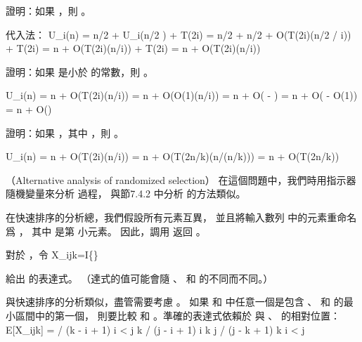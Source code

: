 \startitem
證明：如果 ，則 。
\stopitem

\startANSWER
代入法：
\startformula\startmathalignment
\NC U_i(n)
    \NC = \lfloor n/2 \rfloor + U_i(\lceil n/2 \rceil) + T(2i) \NR
\NC \NC = \lfloor n/2 \rfloor + \lceil n/2 \rceil +
             O(T(2i)\lg(\lfloor n/2 \rfloor / i)) + T(2i) \NR
\NC \NC = n + O(T(2i)\lg(n/i)) + T(2i) \NR
\NC \NC = n + O(T(2i)\lg(n/i)) \NR
\stopmathalignment\stopformula
\stopANSWER

\startitem
證明：如果  是小於  的常數，則 。
\stopitem

\startANSWER
\startformula\startmathalignment
\NC U_i(n)
    \NC = n + O(T(2i)\lg(n/i)) \NR
\NC \NC = n + O(O(1)\lg(n/i)) \NR
\NC \NC = n + O( - ) \NR
\NC \NC = n + O( - O(1)) \NR
\NC \NC = n + O() \NR
\stopmathalignment\stopformula
\stopANSWER

\startitem
證明：如果 ，其中 ，則 。
\stopitem

\startANSWER
\startformula\startmathalignment
\NC U_i(n)
    \NC = n + O(T(2i)\lg(n/i)) \NR
\NC \NC = n + O(T(2n/k)\lg(n/(n/k))) \NR
\NC \NC = n + O(T(2n/k)) \NR
\stopmathalignment\stopformula
\stopANSWER
\stopigBase
\stopPROBLEM

\startPROBLEM
（Alternative analysis of randomized selection）
在這個問題中，我們時用指示器隨機變量來分析  過程，
與節7.4.2 中分析  的方法類似。

在快速排序的分析總，我們假設所有元素互異，
並且將輸入數列  中的元素重命名爲 ，
其中  是第  小元素。
因此，調用  返回 。

對於 ，令
\startformula
X_{ijk}=I\{\}
\stopformula

\startigBase[a]
\startitem
給出  的表達式。
（\hint 達式的值可能會隨 、  和  的不同而不同。）
\stopitem

\startANSWER
與快速排序的分析類似，盡管需要考慮 。
如果  和  中任意一個是包含 、  和  的最小區間中的第一個，
則要比較  和 。準確的表達式依賴於  與 、  的相對位置：
\startformula
E[X_{ijk}] = \startmathcases
{} / (k - i + 1) \MC {} i < j \le k \NR
{} / (j - i + 1) \MC {} i \le k \le j \NR
{} / (j - k + 1) \MC {} k \le i < j \NR
\stopmathcases
\stopformula
\stopANSWER

